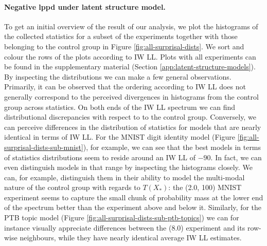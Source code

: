 \paragraph{Negative lppd under latent structure model.}
To get an initial overview of the result of our analysis, we plot the histograms of the collected statistics for a subset of the experiments together with those belonging to the control group in Figure \ref{fig:all-surprisal-dists}. We sort and colour the rows of the plots according to IW LL. Plots with all experiments can be found in the supplementary material (Section \ref{app:latent-structure-models}). By inspecting the distributions we can make a few general observations. Primarily, it can be observed that the ordering according to IW LL does not generally correspond to the perceived divergences in histograms from the control group across statistics. On both ends of the IW LL spectrum we can find distributional discrepancies with respect to to the control group. Conversely, we can perceive differences in the distribution of statistics for models that are nearly identical in terms of IW LL. For the MNIST digit identity model (Figure \ref{fig:all-surprisal-dists-sub-mnist}), for example, we can see that the best models in terms of statistics distributions seem to reside around an IW LL of $-90$. In fact, we can even distinguish models in that range by inspecting the histograms closely. We can, for example, distinguish them in their ability to model the multi-modal nature of the control group with regards to $T(X_*)$: the \infovae (2.0, 100) MNIST experiment seems to capture the small chunk of probability mass at the lower end of the spectrum better than the experiment above and below it. Similarly, for the PTB topic model (Figure \ref{fig:all-surprisal-dists-sub-ptb-topics}) we can for instance visually appreciate differences between the \fbvae (8.0) experiment and its row-wise neighbours, while they have nearly identical average IW LL estimates.

